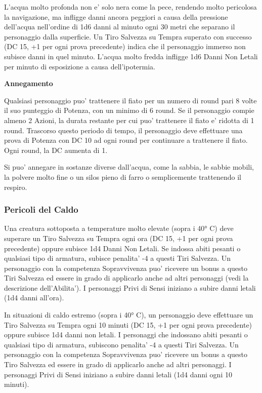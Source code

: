 \documentclass[a4paper,11pt,twoside,openany]{book}
\begin{document}
{L'acqua molto profonda non e' solo nera come la pece, rendendo molto pericolosa la navigazione, ma infligge danni ancora peggiori a causa della pressione dell'acqua nell'ordine di 1d6 danni al minuto ogni 30 metri che separano il personaggio dalla superficie. Un Tiro Salvezza su Tempra superato con successo (DC 15, +1 per ogni prova precedente) indica che il personaggio immerso non subisce danni in quel minuto. L'acqua molto fredda infligge 1d6 Danni Non Letali per minuto di esposizione a causa dell'ipotermia.

\textbf{Annegamento}

Qualsiasi personaggio puo' trattenere il fiato per un numero di round pari 8 volte il suo punteggio di Potenza, con un minimo di 6 round. Se il personaggio compie almeno 2 Azioni, la durata restante per cui puo' trattenere il fiato e' ridotta di 1 round. Trascorso questo periodo di tempo, il personaggio deve effettuare una prova di Potenza con DC 10 ad ogni round per continuare a trattenere il fiato. Ogni round, la DC aumenta di 1.

Si puo' annegare in sostanze diverse dall'acqua, come la sabbia, le sabbie mobili, la polvere molto fine o un silos pieno di farro o semplicemente trattenendo il respiro.

\subsubsection{Pericoli del Caldo}

\label{pericoli-del-caldo}

Una creatura sottoposta a temperature molto elevate (sopra i 40° C) deve superare un Tiro Salvezza su Tempra ogni ora (DC 15, +1 per ogni prova precedente) oppure subisce 1d4 Danni Non Letali. Se indossa abiti pesanti o qualsiasi tipo di armatura, subisce penalita' -4 a questi Tiri Salvezza. Un personaggio con la competenza Sopravvivenza puo' ricevere un bonus a questo Tiri Salvezza ed essere in grado di applicarlo anche ad altri personaggi (vedi la descrizione dell'Abilita'). I personaggi Privi di Sensi iniziano a subire danni letali (1d4 danni all'ora).

In situazioni di caldo estremo (sopra i 40° C), un personaggio deve effettuare un Tiro Salvezza su Tempra ogni 10 minuti (DC 15, +1 per ogni prova precedente) oppure subisce 1d4 danni non letali. I personaggi che indossano abiti pesanti o qualsiasi tipo di armatura, subiscono penalita' -4 a questi Tiri Salvezza. Un personaggio con la competenza Sopravvivenza puo' ricevere un bonus a questo Tiro Salvezza ed essere in grado di applicarlo anche ad altri personaggi. I personaggi Privi di Sensi iniziano a subire danni letali (1d4 danni ogni 10 minuti).

}
\end{document}
